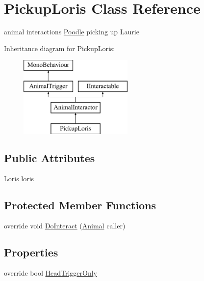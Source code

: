 \hypertarget{class_pickup_loris}{}\section{Pickup\+Loris Class Reference}
\label{class_pickup_loris}


animal interactions \mbox{\hyperlink{class_poodle}{Poodle}} picking up Laurie  


Inheritance diagram for Pickup\+Loris\+:\begin{figure}[H]
\begin{center}
\leavevmode
\includegraphics[height=4.000000cm]{class_pickup_loris}
\end{center}
\end{figure}
\subsection*{Public Attributes}
\begin{DoxyCompactItemize}
\item 
\mbox{\hyperlink{class_loris}{Loris}} \mbox{\hyperlink{class_pickup_loris_a1052fd931394a6ccd682bcd7adc999c6}{loris}}
\end{DoxyCompactItemize}
\subsection*{Protected Member Functions}
\begin{DoxyCompactItemize}
\item 
override void \mbox{\hyperlink{class_pickup_loris_ab6d5a9254471e0936b93d0b3a0cbd69c}{Do\+Interact}} (\mbox{\hyperlink{class_animal}{Animal}} caller)
\end{DoxyCompactItemize}
\subsection*{Properties}
\begin{DoxyCompactItemize}
\item 
override bool \mbox{\hyperlink{class_pickup_loris_af8e991c2de897fd9e08336c60cfdf52d}{Head\+Trigger\+Only}}
\end{DoxyCompactItemize}
